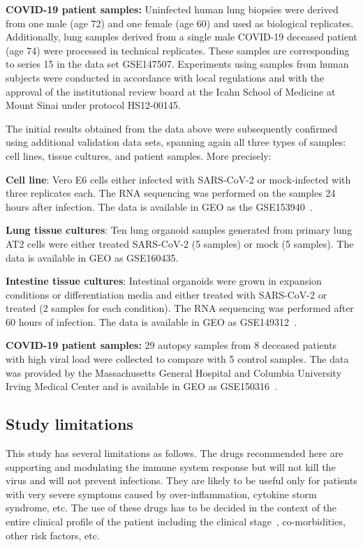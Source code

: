 \textbf{COVID-19 patient samples:} Uninfected human lung biopsies were derived from one male (age 72) and one female (age 60) and used as biological replicates. Additionally, lung samples derived from a single male COVID-19 deceased patient (age 74) were processed in technical replicates. These samples are corresponding to series 15 in the data set GSE147507. Experiments using samples from human subjects were conducted in accordance with local regulations and with the approval of the institutional review board at the Icahn School of Medicine at Mount Sinai under protocol HS12-00145.

The initial results obtained from the data above were subsequently confirmed using additional validation data sets, spanning again all  three types of samples: cell lines, tissue cultures, and patient samples. More precisely:  

\textbf{Cell line}: Vero E6 cells either infected with SARS-CoV-2 or mock-infected with three replicates each. The RNA sequencing was performed on the samples 24 hours after infection. The data is available in GEO as the GSE153940~\cite{Riva:2020}.

\textbf{Lung tissue cultures}: Ten lung organoid samples generated from primary lung AT2 cells were either treated SARS-CoV-2 (5 samples) or mock (5 samples). The data is available in GEO as  GSE160435.

\textbf{Intestine tissue cultures}: Intestinal organoids were grown in expansion conditions or differentiation media and either treated with SARS-CoV-2 or treated (2 samples for each condition). The RNA sequencing was performed after 60 hours of infection. The data is available in GEO as GSE149312~\cite{Lamers:2020}.

\textbf{COVID-19 patient samples:} 29 autopsy samples from 8 deceased patients with high viral load were collected to compare with 5 control samples. The data was provided by the Massachusetts General Hospital and Columbia University Irving Medical Center and is available in GEO as GSE150316~\cite{desai2020temporal}.



\subsection{Study limitations}
This study has several limitations as follows. The drugs recommended here are supporting and modulating the immune system response but will not kill the virus and will not prevent infections. They are likely to be useful only for patients with very severe symptoms caused by over-inflammation,  cytokine storm syndrome, etc.  
The use of these drugs has to be decided in the context of the entire clinical profile of the patient including the clinical stage~\cite{siddiqi2020covid}, co-morbidities, other risk factors, etc.


